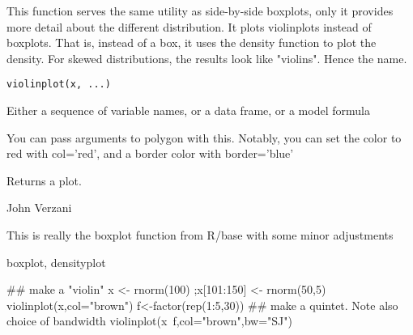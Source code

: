 \begin{Description}\relax
This function serves the same utility as side-by-side boxplots, only
it provides more detail about the different distribution. It
plots violinplots instead of boxplots. That is, instead of a box, it
uses the density function to plot the density. For skewed
distributions, the results look like "violins". Hence the name.
\end{Description}
\begin{Usage}
\begin{verbatim}
violinplot(x, ...)
\end{verbatim}
\end{Usage}
\begin{Arguments}
\begin{ldescription}
\item[\code{x}] Either a sequence of variable names, or a data frame, or a
model formula
\item[\code{...}] You can pass arguments to polygon with this. Notably, you 
can set the color to red with col='red', and a border color with border='blue'
\end{ldescription}
\end{Arguments}
\begin{Value}
Returns a plot.
\end{Value}
\begin{Author}\relax
John Verzani
\end{Author}
\begin{References}\relax
This is really the boxplot function from R/base with some
minor adjustments
\end{References}
\begin{SeeAlso}\relax
boxplot, densityplot
\end{SeeAlso}
\begin{Examples}
\begin{ExampleCode}
## make a "violin"
x <- rnorm(100) ;x[101:150] <- rnorm(50,5)
violinplot(x,col="brown")
f<-factor(rep(1:5,30))
## make a quintet. Note also choice of bandwidth
violinplot(x~f,col="brown",bw="SJ")


\end{ExampleCode}
\end{Examples}

